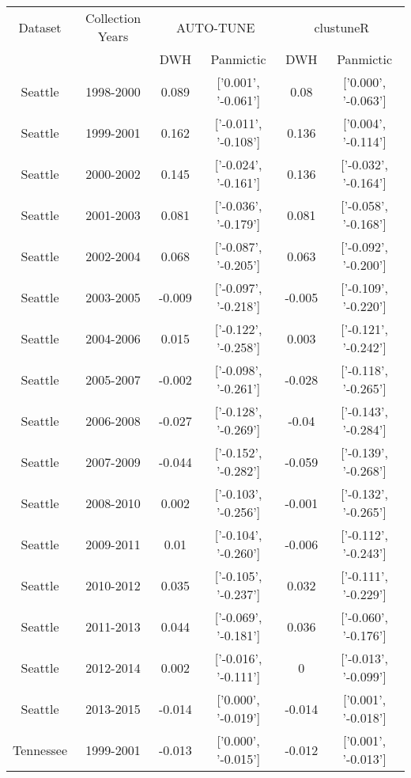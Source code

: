 \documentclass[utf8]{FrontiersinHarvard} %
\begin{document}
\begin{table}[h]
\vspace{8pt}
\centering
\begin{tabular}{|c|c|c|c|c|c|}
	\hline
	Dataset  & Collection Years & \multicolumn{2}{c|}{AUTO-TUNE} & \multicolumn{2}{c|}{clustuneR}                                          \\
	\cline{3-6}
                    &   & DWH & Panmictic & DWH & Panmictic \\
	\hline
	Seattle & 1998-2000 & 0.089 & ['0.001', '-0.061'] & 0.08 & ['0.000', '-0.063'] \\
  Seattle & 1999-2001 & 0.162 & ['-0.011', '-0.108'] & 0.136 & ['0.004', '-0.114']\\
  Seattle & 2000-2002 & 0.145 & ['-0.024', '-0.161'] & 0.136 & ['-0.032', '-0.164']\\
  Seattle & 2001-2003 & 0.081 & ['-0.036', '-0.179'] & 0.081 & ['-0.058', '-0.168']\\
  Seattle & 2002-2004 & 0.068 & ['-0.087', '-0.205'] & 0.063 & ['-0.092', '-0.200']\\
  Seattle & 2003-2005 & -0.009 & ['-0.097', '-0.218'] & -0.005 & ['-0.109', '-0.220']\\
  Seattle & 2004-2006 & 0.015 & ['-0.122', '-0.258'] & 0.003 & ['-0.121', '-0.242']\\
  Seattle & 2005-2007 & -0.002 & ['-0.098', '-0.261'] & -0.028 & ['-0.118', '-0.265']\\
  Seattle & 2006-2008 & -0.027 & ['-0.128', '-0.269'] & -0.04 & ['-0.143', '-0.284']\\
  Seattle & 2007-2009 & -0.044 & ['-0.152', '-0.282'] & -0.059 & ['-0.139', '-0.268']\\
  Seattle & 2008-2010 & 0.002 & ['-0.103', '-0.256'] & -0.001 & ['-0.132', '-0.265']\\
  Seattle & 2009-2011 & 0.01 & ['-0.104', '-0.260'] & -0.006 & ['-0.112', '-0.243']\\
  Seattle & 2010-2012 & 0.035 & ['-0.105', '-0.237'] & 0.032 & ['-0.111', '-0.229']\\
  Seattle & 2011-2013 & 0.044 & ['-0.069', '-0.181'] & 0.036 & ['-0.060', '-0.176']\\
  Seattle & 2012-2014 & 0.002 & ['-0.016', '-0.111'] & 0 & ['-0.013', '-0.099']\\
	Seattle & 2013-2015 & -0.014 & ['0.000', '-0.019'] & -0.014 & ['0.001', '-0.018'] \\
	\midrule
	Tennessee & 1999-2001 & -0.013 & ['0.000', '-0.015'] & -0.012 & ['0.001', '-0.013']\\

\end{tabular}
\end{table}
\end{document}
